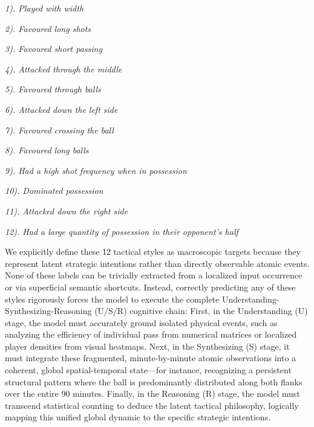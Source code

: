 \textit{1). Played with width}

\textit{2). Favoured long shots}

\textit{3). Favoured short passing}

\textit{4). Attacked through the middle}

\textit{5). Favoured through balls}

\textit{6). Attacked down the left side}

\textit{7). Favoured crossing the ball}

\textit{8). Favoured long balls}

\textit{9). Had a high shot frequency when in possession}

\textit{10). Dominated possession}

\textit{11). Attacked down the right side}

\textit{12). Had a large quantity of possession in their opponent's half}

We explicitly define these 12 tactical styles as macroscopic targets because they represent latent strategic intentions rather than directly observable atomic events. None of these labels can be trivially extracted from a localized input occurrence or via superficial semantic shortcuts. Instead, correctly predicting any of these styles rigorously forces the model to execute the complete Understanding-Synthesizing-Reasoning (U/S/R) cognitive chain: First, in the Understanding (U) stage, the model must accurately ground isolated physical events, such as analyzing the efficiency of individual pass from numerical matrices or localized player densities from visual heatmaps. Next, in the Synthesizing (S) stage, it must integrate these fragmented, minute-by-minute atomic observations into a coherent, global spatial-temporal state—for instance, recognizing a persistent structural pattern where the ball is predominantly distributed along both flanks over the entire 90 minutes. Finally, in the Reasoning (R) stage, the model must transcend statistical counting to deduce the latent tactical philosophy, logically mapping this unified global dynamic to the specific strategic intentions.


